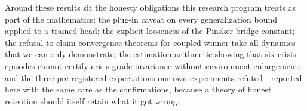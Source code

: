 \documentclass[11pt,a4paper]{article}
\theoremstyle{definition}
\theoremstyle{plain}
\begin{document}
Around these results sit the honesty obligations this research program
treats as part of the mathematics: the plug-in caveat on every
generalization bound applied to a trained head; the explicit looseness of
the Pinsker bridge constant; the refusal to claim convergence theorems
for coupled winner-take-all dynamics that we can only demonstrate; the
estimation arithmetic showing that six crisis episodes cannot certify
crisis-grade invariance without environment enlargement; and the three
pre-registered expectations our own experiments refuted---reported here
with the same care as the confirmations, because a theory of honest
retention should itself retain what it got wrong.



\end{document}
